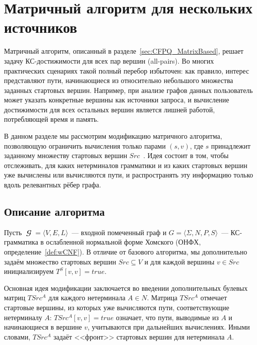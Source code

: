 \section{Матричный алгоритм для нескольких источников}
\label{sec:CFPQ_MatrixMultiSource}

Матричный алгоритм, описанный в разделе~\ref{sec:CFPQ_MatrixBased}, решает задачу КС-достижимости для всех пар вершин (all-pairs).
Во многих практических сценариях такой полный перебор избыточен: как правило, интерес представляют пути, начинающиеся из относительно небольшого множества заданных стартовых вершин.
Например, при анализе графов данных пользователь может указать конкретные вершины как источники запроса, и вычисление достижимости для всех остальных вершин является лишней работой, потребляющей время и память.

В данном разделе мы рассмотрим модификацию матричного алгоритма, позволяющую ограничить вычисления только парами $(s, v)$, где $s$ принадлежит заданному множеству стартовых вершин $\mathit{Src}$~.
Идея состоит в том, чтобы отслеживать, для каких нетерминалов грамматики и из каких стартовых вершин уже вычислены или вычисляются пути, и распространять эту информацию только вдоль релевантных рёбер графа.

\subsection{Описание алгоритма}
\label{subsec:CFPQ_MatrixMultiSource_description}

Пусть $\mbfscrG = \langle V, E, L \rangle$~--- входной помеченный граф и $G = \langle \Sigma, N, P, S \rangle$~--- КС-грамматика в ослабленной нормальной форме Хомского (ОНФХ, определение~\ref{def:wCNF}).
В отличие от базового алгоритма, мы дополнительно задаём множество стартовых вершин $\mathit{Src} \subseteq V$ и для каждой вершины $v \in \mathit{Src}$ инициализируем $T^S[v,v] = \mathit{true}$.

Основная идея модификации заключается во введении дополнительных булевых матриц $TSrc^A$ для каждого нетерминала $A \in N$.
Матрица $TSrc^A$ отмечает стартовые вершины, из которых уже вычисляются пути, соответствующие нетерминалу $A$: $TSrc^A[v,v] = \mathit{true}$ означает, что пути, выводимые из $A$ и начинающиеся в вершине $v$, учитываются при дальнейших вычислениях.
Иными словами, $TSrc^A$ задаёт <<фронт>> стартовых вершин для нетерминала $A$.


